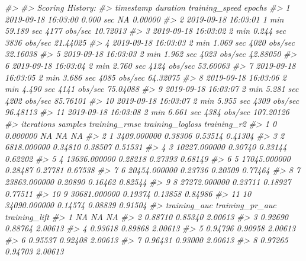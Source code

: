 \documentclass[]{book}
\newenvironment{Shaded}{\begin{snugshade}}{\end{snugshade}}
\newcommand{\CommentTok}[1]{\textcolor[rgb]{0.56,0.35,0.01}{\textit{#1}}}
\begin{document}
\begin{Shaded}
\begin{Highlighting}[]
{{{{{{\CommentTok{#> }
\CommentTok{#> Scoring History: }
\CommentTok{#>              timestamp          duration training_speed    epochs}
\CommentTok{#> 1  2019-09-18 16:03:00         0.000 sec             NA   0.00000}
\CommentTok{#> 2  2019-09-18 16:03:01  1 min 59.189 sec   4177 obs/sec  10.72013}
\CommentTok{#> 3  2019-09-18 16:03:02  2 min  0.244 sec   3836 obs/sec  21.44025}
\CommentTok{#> 4  2019-09-18 16:03:03  2 min  1.069 sec   4020 obs/sec  32.16038}
\CommentTok{#> 5  2019-09-18 16:03:03  2 min  1.962 sec   4023 obs/sec  42.88050}
\CommentTok{#> 6  2019-09-18 16:03:04  2 min  2.760 sec   4124 obs/sec  53.60063}
\CommentTok{#> 7  2019-09-18 16:03:05  2 min  3.686 sec   4085 obs/sec  64.32075}
\CommentTok{#> 8  2019-09-18 16:03:06  2 min  4.490 sec   4141 obs/sec  75.04088}
\CommentTok{#> 9  2019-09-18 16:03:07  2 min  5.281 sec   4202 obs/sec  85.76101}
\CommentTok{#> 10 2019-09-18 16:03:07  2 min  5.955 sec   4309 obs/sec  96.48113}
\CommentTok{#> 11 2019-09-18 16:03:08  2 min  6.661 sec   4384 obs/sec 107.20126}
\CommentTok{#>    iterations      samples training_rmse training_logloss training_r2}
\CommentTok{#> 1           0     0.000000            NA               NA          NA}
\CommentTok{#> 2           1  3409.000000       0.38306          0.53514     0.41304}
\CommentTok{#> 3           2  6818.000000       0.34810          0.38507     0.51531}
\CommentTok{#> 4           3 10227.000000       0.30740          0.33144     0.62202}
\CommentTok{#> 5           4 13636.000000       0.28218          0.27393     0.68149}
\CommentTok{#> 6           5 17045.000000       0.28487          0.27781     0.67538}
\CommentTok{#> 7           6 20454.000000       0.23736          0.20509     0.77464}
\CommentTok{#> 8           7 23863.000000       0.20890          0.16462     0.82544}
\CommentTok{#> 9           8 27272.000000       0.23711          0.18927     0.77511}
\CommentTok{#> 10          9 30681.000000       0.19374          0.13858     0.84986}
\CommentTok{#> 11         10 34090.000000       0.14574          0.08839     0.91504}
\CommentTok{#>    training_auc training_pr_auc training_lift}
\CommentTok{#> 1            NA              NA            NA}
\CommentTok{#> 2       0.88710         0.85340       2.00613}
\CommentTok{#> 3       0.92690         0.88764       2.00613}
\CommentTok{#> 4       0.93618         0.89868       2.00613}
\CommentTok{#> 5       0.94796         0.90958       2.00613}
\CommentTok{#> 6       0.95537         0.92408       2.00613}
\CommentTok{#> 7       0.96431         0.93000       2.00613}
\CommentTok{#> 8       0.97265         0.94703       2.00613}
}}}}}}
\end{Highlighting}
\end{Shaded}
\end{document}

